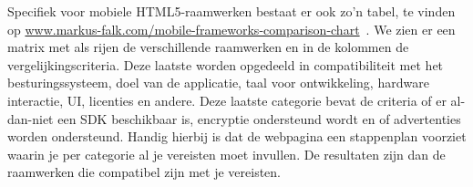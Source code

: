 Specifiek voor mobiele HTML5-raamwerken bestaat er ook zo'n tabel,  te vinden op \url{www.markus-falk.com/mobile-frameworks-comparison-chart}~\cite{Falk2011}.  
We zien er een matrix met als rijen de verschillende raamwerken en in de kolommen de vergelijkingscriteria.  
Deze laatste worden opgedeeld in compatibiliteit met het besturingssysteem,  doel van de applicatie,  taal voor ontwikkeling,  hardware interactie,  UI,  licenties en andere.  
Deze laatste categorie bevat de criteria of er al-dan-niet een SDK beschikbaar is, encryptie ondersteund wordt en of advertenties worden ondersteund.  
Handig hierbij is dat de webpagina een stappenplan voorziet waarin je per categorie al je vereisten moet invullen.  
De resultaten zijn dan de raamwerken die compatibel zijn met je vereisten.

